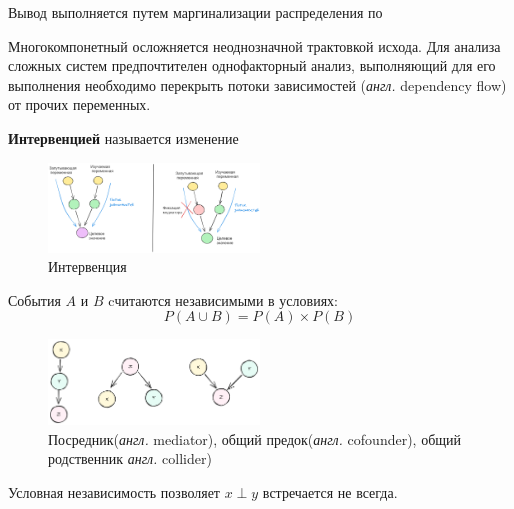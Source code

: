Вывод выполняется путем маргинализации распределения по 



Многокомпонетный осложняется неоднозначной трактовкой исхода. 
Для анализа сложных систем предпочтителен однофакторный анализ, выполняющий
для его выполнения необходимо перекрыть потоки зависимостей (\textit{англ.} dependency flow) от
прочих переменных.

 \textbf{Интервенцией} называется изменение 

\begin{figure}[h]
    \centering
    \includegraphics[width=0.5\textwidth]{assets/math/discrete/dep_flow.excalidraw.png}
    \caption{Интервенция}
    \label{discr_vs_gen}
\end{figure}





 События $A$ и $B$ cчитаются независимыми в условиях:
\begin{equation}
    P(A \cup B) = P(A) \times P(B)
\end{equation}





\begin{figure}[h]
    \centering
    \includegraphics[width=0.5\textwidth]{assets/math/discrete/bayes_net.excalidraw.png}
    \caption{Посредник(\textit{англ.} mediator), общий предок(\textit{англ.} cofounder), 
 общий родственник \textit{англ.} collider) }
    \label{discr_vs_gen}
\end{figure}




Условная независимость позволяет 
$x \perp y$ встречается не всегда.


